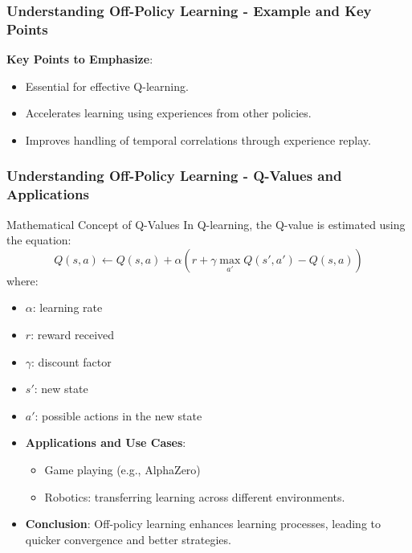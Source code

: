 \documentclass{beamer}
\begin{document}
\begin{frame}[fragile]
    \frametitle{Understanding Off-Policy Learning - Example and Key Points}
        \item \textbf{Key Points to Emphasize}:
            \begin{itemize}
                \item Essential for effective Q-learning.
                \item Accelerates learning using experiences from other policies.
                \item Improves handling of temporal correlations through experience replay.
            \end{itemize}
\end{frame}

\begin{frame}[fragile]
    \frametitle{Understanding Off-Policy Learning - Q-Values and Applications}
    \begin{block}{Mathematical Concept of Q-Values}
        In Q-learning, the Q-value is estimated using the equation:
        \begin{equation}
            Q(s, a) \leftarrow Q(s, a) + \alpha \left( r + \gamma \max_{a'} Q(s', a') - Q(s, a) \right)
        \end{equation}
        where:
        \begin{itemize}
            \item $\alpha$: learning rate
            \item $r$: reward received
            \item $\gamma$: discount factor
            \item $s'$: new state
            \item $a'$: possible actions in the new state
        \end{itemize}
    \end{block}
    
    \begin{itemize}
        \item \textbf{Applications and Use Cases}:
            \begin{itemize}
                \item Game playing (e.g., AlphaZero)
                \item Robotics: transferring learning across different environments.
            \end{itemize}
        \item \textbf{Conclusion}: Off-policy learning enhances learning processes, leading to quicker convergence and better strategies.
    \end{itemize}
\end{frame}
\end{document}
